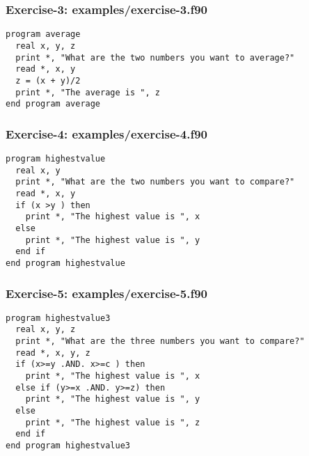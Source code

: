\documentclass[xcolor=dvipsnames,dvip,notes=show,table]{beamer}
\begin{document}
\begin{frame}[fragile]
\frametitle{Exercise-3: examples/exercise-3.f90}
\scriptsize
\begin{lstlisting}
program average
  real x, y, z
  print *, "What are the two numbers you want to average?"
  read *, x, y
  z = (x + y)/2
  print *, "The average is ", z
end program average
\end{lstlisting}
\end{frame}




\begin{frame}[fragile]
\frametitle{Exercise-4: examples/exercise-4.f90}
\scriptsize
\begin{lstlisting}
program highestvalue
  real x, y
  print *, "What are the two numbers you want to compare?"
  read *, x, y
  if (x >y ) then 
    print *, "The highest value is ", x
  else 
    print *, "The highest value is ", y
  end if
end program highestvalue
\end{lstlisting}
\end{frame}




\begin{frame}[fragile]
\frametitle{Exercise-5: examples/exercise-5.f90}
\scriptsize
\begin{lstlisting}
program highestvalue3
  real x, y, z
  print *, "What are the three numbers you want to compare?"
  read *, x, y, z
  if (x>=y .AND. x>=c ) then 
    print *, "The highest value is ", x
  else if (y>=x .AND. y>=z) then
    print *, "The highest value is ", y
  else 
    print *, "The highest value is ", z
  end if
end program highestvalue3
\end{lstlisting}
\end{frame}


\end{document}
